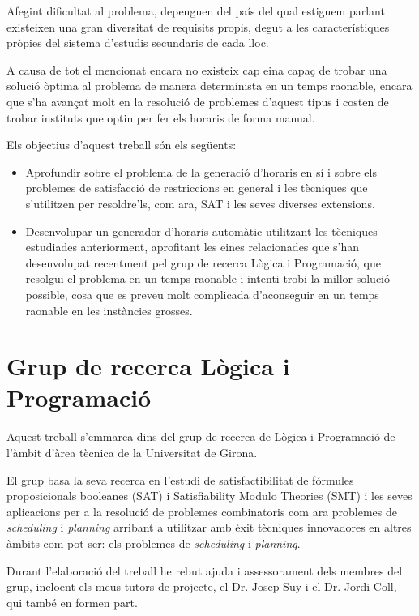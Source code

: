\documentclass[11pt,a4paper,twoside]{report}
\begin{document}
  Afegint dificultat al problema, depenguen del país del qual estiguem parlant existeixen una gran diversitat de requisits propis, degut a les característiques pròpies del sistema d'estudis secundaris de cada lloc.

  A causa de tot el mencionat encara no existeix cap eina capaç de trobar una solució òptima al problema de manera determinista en un temps raonable, encara que s'ha avançat molt en la resolució de problemes d'aquest tipus i costen de trobar instituts que optin per fer els horaris de forma manual.
  
  Els objectius d'aquest treball són els següents:
  \begin{itemize}
    \item Aprofundir sobre el problema de la generació d'horaris en sí i sobre els problemes de satisfacció de restriccions en general i les tècniques que s'utilitzen per resoldre'ls, com ara, SAT i les seves diverses extensions.
    \item Desenvolupar un generador d'horaris automàtic utilitzant les tècniques estudiades anteriorment, aprofitant les eines relacionades que s'han desenvolupat recentment pel grup de recerca Lògica i Programació, que resolgui el problema en un temps raonable i intenti trobi la millor solució possible, 
    cosa que es preveu molt complicada d'aconseguir en un temps raonable en les instàncies grosses.
    
  \end{itemize}
  
  \section{Grup de recerca Lògica i Programació}
  Aquest treball s'emmarca dins del grup de recerca de Lògica i Programació de l'àmbit d'àrea tècnica de la Universitat de Girona.

  El grup basa la seva recerca en l'estudi de satisfactibilitat de fórmules proposicionals booleanes (SAT) i Satisfiability Modulo Theories (SMT) i les seves
  aplicacions per a la resolució de problemes combinatoris com ara problemes de \textit{scheduling} i \textit{planning} arribant a utilitzar amb èxit tècniques innovadores en altres àmbits com
  pot ser: els problemes de \textit{scheduling} i \textit{planning}.

  Durant l'elaboració del treball he rebut ajuda i assessorament dels membres del grup, incloent els meus tutors de projecte, el Dr. Josep Suy i el Dr. Jordi Coll, qui també en formen part.
\end{document}

